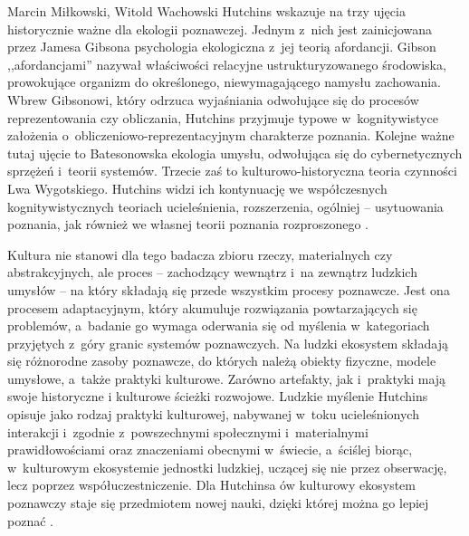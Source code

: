 \begin{artplenv2auth}{Marcin Miłkowski, Witold Wachowski}
Hutchins wskazuje na trzy ujęcia historycznie ważne dla ekologii poznawczej. Jednym z~nich jest zainicjowana przez Jamesa Gibsona psychologia ekologiczna z~jej teorią afordancji. Gibson ,,afordancjami'' nazywał właściwości relacyjne ustrukturyzowanego środowiska, prowokujące organizm do określonego, niewymagającego namysłu zachowania. Wbrew Gibsonowi, który odrzuca wyjaśniania odwołujące się do procesów reprezentowania czy obliczania, Hutchins przyjmuje typowe w~kognitywistyce założenia o~obliczeniowo-reprezentacyjnym charakterze poznania. Kolejne ważne tutaj ujęcie to Batesonowska ekologia umysłu, odwołująca się do cybernetycznych sprzężeń i~teorii systemów. Trzecie zaś to kulturowo-historyczna teoria czynności Lwa Wygotskiego. Hutchins widzi ich kontynuację we współczesnych kognitywistycznych teoriach ucieleśnienia, rozszerzenia, ogólniej -- usytuowania poznania, jak również we własnej teorii poznania rozproszonego
\parencite[][s.~707–712]{hutchins_cognitive_2010}.%


Kultura nie stanowi dla tego badacza zbioru rzeczy, materialnych czy abstrakcyjnych, ale proces -- zachodzący wewnątrz i~na zewnątrz ludzkich umysłów -- na który składają się przede wszystkim procesy poznawcze. Jest ona procesem adaptacyjnym, który akumuluje rozwiązania powtarzających się problemów, a~badanie go wymaga oderwania się od myślenia w~kategoriach przyjętych z~góry granic systemów poznawczych. Na ludzki ekosystem składają się różnorodne zasoby poznawcze, do których należą obiekty fizyczne, modele umysłowe, a~także praktyki kulturowe. Zarówno artefakty, jak i~praktyki mają swoje historyczne i kulturowe ścieżki rozwojowe. Ludzkie myślenie Hutchins opisuje jako rodzaj praktyki kulturowej, nabywanej w~toku ucieleśnionych interakcji i~zgodnie z~powszechnymi społecznymi i~materialnymi prawidłowościami oraz znaczeniami obecnymi w~świecie, a~ściślej biorąc, w~kulturowym ekosystemie jednostki ludzkiej, uczącej się nie przez obserwację, lecz poprzez współuczestniczenie. Dla Hutchinsa ów kulturowy ekosystem poznawczy staje się przedmiotem nowej nauki, dzięki której można go lepiej poznać
\parencites[][s.~353–355]{hutchins_cognition_1995}{hutchins_distributed_2006}{hutchins_cultural_2014}.%



\end{artplenv2auth}
